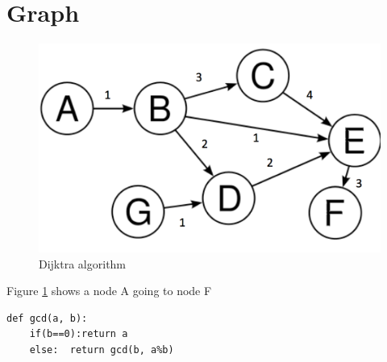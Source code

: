 \documentclass{article}
\begin{document}
\section{Graph}
\begin{figure}
	\includegraphics[width=\linewidth]{graph.png} %
	\caption{Dijktra algorithm}
	\label{fig:graph}
\end{figure}

Figure \ref{fig:graph} shows a node A going to node F %

\begin{lstlisting}
def gcd(a, b):
	if(b==0):return a
	else:  return gcd(b, a%b)
\end{lstlisting}
\end{document}
